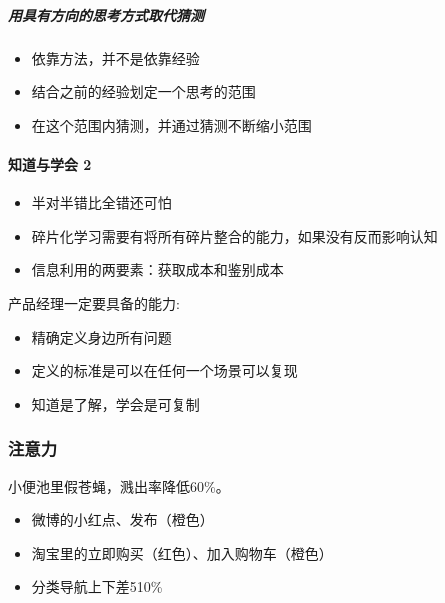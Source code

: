 \documentclass[letterpaper,10pt,english]{sphinxmanual}
\begin{document}
\subparagraph{用具有方向的思考方式取代猜测}
\label{\detokenize{chapter_idea/critical:id5}}\begin{itemize}
\item {} 
依靠方法，并不是依靠经验

\item {} 
结合之前的经验划定一个思考的范围

\item {} 
在这个范围内猜测，并通过猜测不断缩小范围

\end{itemize}


\paragraph{知道与学会 2\sphinxfootnotemark[421]}
\label{\detokenize{chapter_idea/critical:id6}}%
\begin{footnotetext}[421]\sphinxAtStartFootnote
{}
%
\end{footnotetext}\ignorespaces \begin{itemize}
\item {} 
半对半错比全错还可怕

\item {} 
碎片化学习需要有将所有碎片整合的能力，如果没有反而影响认知

\item {} 
信息利用的两要素：获取成本和鉴别成本

\end{itemize}

产品经理一定要具备的能力:
\begin{itemize}
\item {} 
精确定义身边所有问题

\item {} 
定义的标准是可以在任何一个场景可以复现

\item {} 
知道是了解，学会是可复制

\end{itemize}


\subsubsection{注意力}
\label{\detokenize{chapter_idea/attention:id1}}\label{\detokenize{chapter_idea/attention::doc}}
小便池里假苍蝇，溅出率降低60\%。
\begin{itemize}
\item {} 
微博的小红点、发布（橙色）

\item {} 
淘宝里的立即购买（红色）、加入购物车（橙色）

\item {} 
分类导航上下差5\sphinxhyphen{}10\%

\end{itemize}
\end{document}

